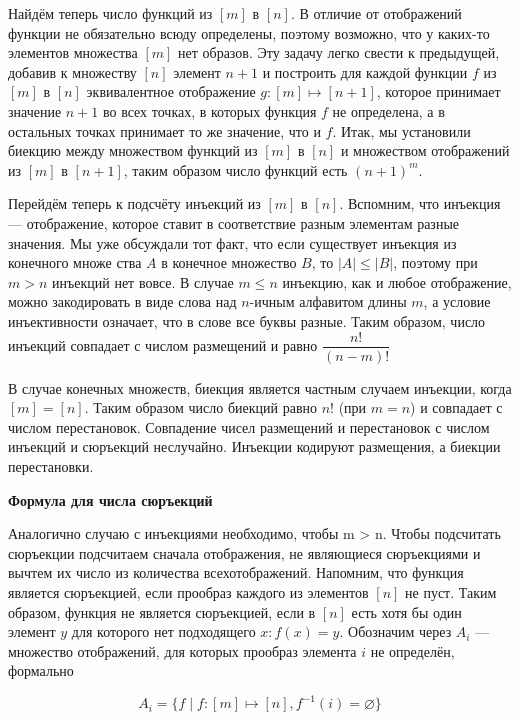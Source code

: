 \documentclass[a4paper]{article}
\newcommand\enumtocitem[3]{\item\textbf{#1}\addtocounter{#2}{1}\addcontentsline{toc}{#2}{\protect{\numberline{#3}} #1}}
\newcommand\proofitem[1]{\enumtocitem{#1}{subsection}{\thesubsection}}
\begin{document}
\begin{colloq}
        Найдём теперь число функций из $[m]$ в $[n]$. В отличие от отображений функции не обязательно всюду определены, поэтому возможно, что у каких-то элементов множества $[m]$ нет образов. Эту задачу легко свести к предыдущей, добавив к множеству $[n]$ элемент $n + 1$ и построить для каждой функции $f$ из $[m]$ в $[n]$ эквивалентное отображение $g : [m] \mapsto [n + 1]$, которое принимает значение $n + 1$ во всех точках, в которых функция $f$ не определена, а в остальных точках принимает то же значение, что и $f$. Итак, мы установили биекцию между множеством функций из $[m]$ в $[n]$ и множеством отображений из $[m]$ в $[n+1]$, таким образом число функций есть $(n + 1)^m$. 

        Перейдём теперь к подсчёту инъекций из $[m]$ в $[n]$. Вспомним, что инъекция --- отображение, которое ставит в соответствие разным элементам разные значения. Мы уже обсуждали тот факт, что если существует инъекция из конечного множе ства $A$ в конечное множество $B$, то $|A| \leq |B|$, поэтому при $m > n$ инъекций нет вовсе. В случае $m \leq n$ инъекцию, как и любое отображение, можно закодировать в виде слова над $n$-ичным алфавитом длины $m$, а условие инъективности означает, что в слове все буквы разные. Таким образом, число инъекций совпадает с числом размещений и равно $\dfrac{n!}{(n - m)!}$

        В случае конечных множеств, биекция является частным случаем инъекции, когда $[m] = [n]$. Таким образом число биекций равно $n!$ (при $m = n$) и совпадает с числом перестановок. Совпадение чисел размещений и перестановок с числом инъекций и сюръекций неслучайно. Инъекции кодируют размещения, а биекции перестановки.

    \proofitem{Формула для числа сюръекций}

        Аналогично случаю с инъекциями необходимо, чтобы m > n. Чтобы подсчитать сюръекции подсчитаем сначала отображения, не являющиеся сюръекциями и вычтем их число из количества всехотображений. Напомним, что функция является сюръекцией, если прообраз каждого из элементов $[n]$ не пуст. Таким образом, функция не является сюръекцией, если в $[n]$ есть хотя бы один элемент $y$ для которого нет подходящего $x : f(x) = y$. Обозначим через $A_i$ --- множество отображений, для которых прообраз элемента $i$ не определён, формально

        \begin{equation*}
            A_i = \{f \mid f: [m] \mapsto [n], f^{-1}(i) = \varnothing\}
        \end{equation*}


\end{colloq}
\end{document}
